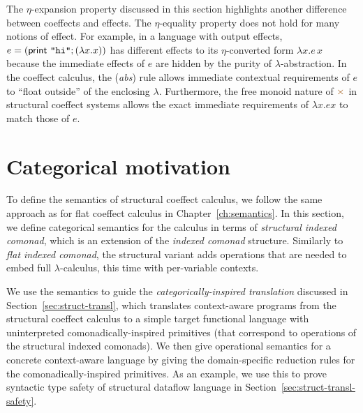\noindent
The $\eta$-expansion property discussed in this section highlights another difference
between coeffects and effects. The $\eta$-equality property does not hold for many notions
of effect. For example, in a language with output effects, $e = (\textsf{print \texttt{"hi"}}; (\lambda x . x))$
has different effects to its $\eta$-converted form $\lambda x . e\,x$ because the immediate
effects of $e$ are hidden by the purity of $\lambda$-abstraction. In the coeffect calculus,
the (\emph{abs}) rule allows immediate contextual requirements of $e$ to ``float outside''
of the enclosing $\lambda$. Furthermore, the free monoid nature of $\atimes$ in structural
coeffect systems allows the exact immediate requirements of $\lambda x . e x$ to match
those of $e$.



%
%

\section{Categorical motivation}
\label{sec:struct-semantics}

To define the semantics of structural coeffect calculus, we follow the same approach as for flat
coeffect calculus in Chapter~\ref{ch:semantics}. In this section, we define categorical semantics
for the calculus in terms of \emph{structural indexed comonad}, which is an extension of the
\emph{indexed comonad} structure. Similarly to \emph{flat indexed comonad}, the structural variant
adds operations that are needed to embed full $\lambda$-calculus, this time with per-variable contexts.

We use the semantics to guide the \emph{categorically-inspired translation} discussed in
Section~\ref{sec:struct-transl}, which translates context-aware programs from the structural coeffect
calculus to a simple target functional language with uninterpreted comonadically-inspired primitives
(that correspond to operations of the structural indexed comonads). We then give operational
semantics for a concrete context-aware language by giving the domain-specific reduction rules for
the comonadically-inspired primitives. As an example, we use this to prove syntactic type safety
of structural dataflow language in Section~\ref{sec:struct-transl-safety}.

